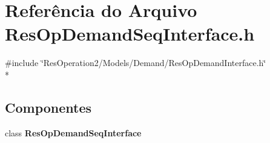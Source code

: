 \section{Referência do Arquivo Res\+Op\+Demand\+Seq\+Interface.\+h}
\label{_res_op_demand_seq_interface_8h}
{\ttfamily \#include \char`\"{}Res\+Operation2/\+Models/\+Demand/\+Res\+Op\+Demand\+Interface.\+h\char`\"{}}\\*
\subsection*{Componentes}
\begin{DoxyCompactItemize}
\item 
class {\bf Res\+Op\+Demand\+Seq\+Interface}
\end{DoxyCompactItemize}
